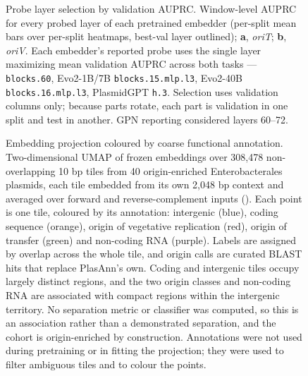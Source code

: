 \begin{figure}[h]
    \centering
\caption{
Probe layer selection by validation AUPRC. Window-level AUPRC for every probed layer of each pretrained embedder (per-split mean bars over per-split heatmaps, best-val layer outlined); \textbf{a}, \emph{oriT}; \textbf{b}, \emph{oriV}. Each embedder's reported probe uses the single layer maximizing mean validation AUPRC across both tasks --- \model \texttt{blocks.60}, Evo2-1B/7B \texttt{blocks.15.mlp.l3}, Evo2-40B \texttt{blocks.16.mlp.l3}, PlasmidGPT \texttt{h.3}. Selection uses validation columns only; because parts rotate, each part is validation in one split and test in another. GPN reporting considered layers 60--72.
}
\label{fig:ed-layer}
\end{figure}

\begin{figure}[h]
    \centering
\caption{
Embedding projection coloured by coarse functional annotation. Two-dimensional UMAP of frozen \model embeddings over 308,478 non-overlapping 10 bp tiles from 40 origin-enriched Enterobacterales plasmids, each tile embedded from its own 2,048 bp context and averaged over forward and reverse-complement inputs (). Each point is one tile, coloured by its annotation: intergenic (blue), coding sequence (orange), origin of vegetative replication (red), origin of transfer (green) and non-coding RNA (purple). Labels are assigned by overlap across the whole tile, and origin calls are curated BLAST hits that replace PlasAnn's own. Coding and intergenic tiles occupy largely distinct regions, and the two origin classes and non-coding RNA are associated with compact regions within the intergenic territory. No separation metric or classifier was computed, so this is an association rather than a demonstrated separation, and the cohort is origin-enriched by construction. Annotations were not used during pretraining or in fitting the projection; they were used to filter ambiguous tiles and to colour the points.
}
\label{fig:ed-umap-feature}
\end{figure}


